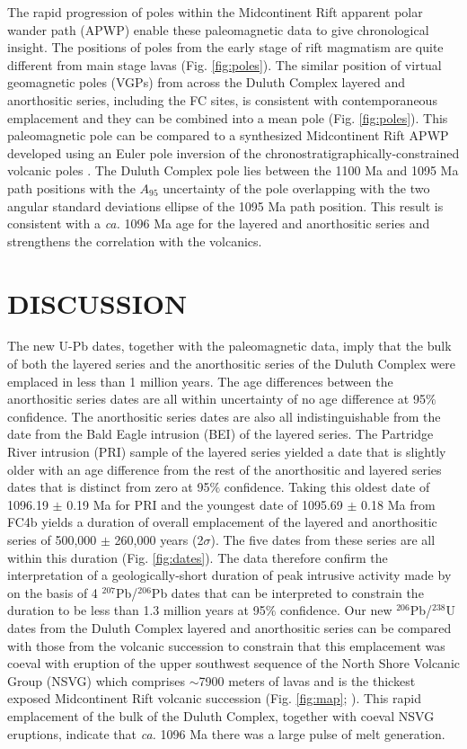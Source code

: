 \documentclass[11pt,letterpaper]{article}
\begin{document}
The rapid progression of poles within the Midcontinent Rift apparent polar wander path (APWP) enable these paleomagnetic data to give chronological insight. The positions of poles from the early stage of rift magmatism are quite different from main stage lavas (Fig. \ref{fig:poles}). The similar position of virtual geomagnetic poles (VGPs) from across the Duluth Complex layered and anorthositic series, including the FC sites, is consistent with contemporaneous emplacement and they can be combined into a mean pole (Fig. \ref{fig:poles}). This paleomagnetic pole can be compared to a synthesized Midcontinent Rift APWP developed using an Euler pole inversion of the chronostratigraphically-constrained volcanic poles \citep{Swanson-Hysell2019a}. The Duluth Complex pole lies between the 1100 Ma and 1095 Ma path positions with the $A_{95}$ uncertainty of the pole overlapping with the two angular standard deviations ellipse of the 1095 Ma path position. This result is consistent with a \textit{ca.} 1096 Ma age for the layered and anorthositic series and strengthens the correlation with the volcanics.

\section*{DISCUSSION}

The new U-Pb dates, together with the paleomagnetic data, imply that the bulk of both the layered series and the anorthositic series of the Duluth Complex were emplaced in less than 1 million years. The age differences between the anorthositic series dates are all within uncertainty of no age difference at 95$\%$ confidence. The anorthositic series dates are also all indistinguishable from the date from the Bald Eagle intrusion (BEI) of the layered series. The Partridge River intrusion (PRI) sample of the layered series yielded a date that is slightly older with an age difference from the rest of the anorthositic and layered series dates that is distinct from zero at 95$\%$ confidence. Taking this oldest date of 1096.19 $\pm$ 0.19 Ma for PRI and the youngest date of 1095.69 $\pm$ 0.18 Ma from FC4b yields a duration of overall emplacement of the layered and anorthositic series of 500,000 $\pm$ 260,000 years (2$\sigma$). The five dates from these series are all within this duration (Fig. \ref{fig:dates}). The data therefore confirm the interpretation of a geologically-short duration of peak intrusive activity made by \cite{Paces1993a} on the basis of 4 $^{207}$Pb/$^{206}$Pb dates that can be interpreted to constrain the duration to be less than 1.3 million years at 95$\%$ confidence. Our new $^{206}$Pb/$^{238}$U dates from the Duluth Complex layered and anorthositic series can be compared with those from the volcanic succession to constrain that this emplacement was coeval with eruption of the upper southwest sequence of the North Shore Volcanic Group (NSVG) which comprises $\sim$7900 meters of lavas and is the thickest exposed Midcontinent Rift volcanic succession (Fig. \ref{fig:map}; \citealp{Green2011a,Swanson-Hysell2019a}). This rapid emplacement of the bulk of the Duluth Complex, together with coeval NSVG eruptions, indicate that \textit{ca.} 1096 Ma there was a large pulse of melt generation.
\end{document}
